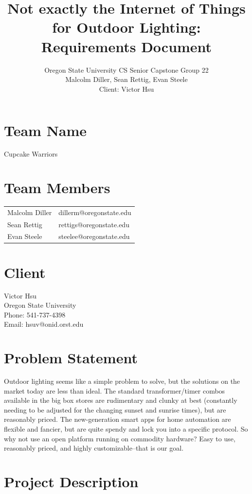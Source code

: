 \documentclass[12pt]{article}
\title{Not exactly the Internet of Things for Outdoor Lighting: Requirements Document}
\author{Oregon State University CS Senior Capstone Group 22\\Malcolm Diller, Sean Rettig, Evan Steele\\Client: Victor Hsu}
\begin{document}
 

\maketitle

\pagebreak

\section{Team Name}

Cupcake Warriors

\section{Team Members}

\begin{tabular}{ l l } 
    Malcolm Diller & dillerm@oregonstate.edu\\ 
    Sean Rettig & rettigs@oregonstate.edu\\
    Evan Steele & steelee@oregonstate.edu\\ \end{tabular}

\section{Client}

Victor Hsu\\
Oregon State University\\
Phone: 541-737-4398\\
Email: hsuv@onid.orst.edu

\section{Problem Statement}

Outdoor lighting seems like a simple problem to solve, but the solutions on the
market today are less than ideal.  The standard transformer/timer combos
available in the big box stores are rudimentary and clunky at best (constantly
needing to be adjusted for the changing sunset and sunrise times), but are
reasonably priced. The new-generation smart apps for home automation are
flexible and fancier, but are quite spendy and lock you into a specific
protocol.  So why not use an open platform running on commodity hardware?  Easy
to use, reasonably priced, and highly customizable--that is our goal.

\section{Project Description}
\end{document}
